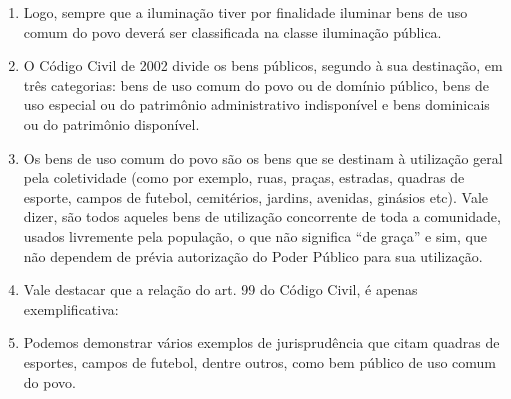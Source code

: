 \begin{enumerate}[resume]
{II - bens públicos destinados ao uso comum do povo, tais como abrigos de usuários de transportes coletivos, praças, parques e jardins, ainda que o uso esteja sujeito a condições estabelecidas pela administração, inclusive o cercamento, a restrição de horários e a cobrança. (Incluído pela REN ANEEL 800, de 19.12.2017). (Grifou-se) }

\item
Logo, sempre que a iluminação tiver por finalidade iluminar bens de uso comum do povo deverá ser classificada na classe iluminação pública.   
\item 
O Código Civil de 2002 divide os bens públicos, segundo à sua destinação, em três categorias: bens de uso comum do povo ou de domínio público, bens de uso especial ou do patrimônio administrativo indisponível e bens dominicais ou do patrimônio disponível.   
\item
Os bens de uso comum do povo são os bens que se destinam à utilização geral pela coletividade (como por exemplo, ruas, praças, estradas, quadras de esporte, campos de futebol, cemitérios, jardins, avenidas, ginásios etc). Vale dizer, são todos aqueles bens de utilização concorrente de toda a comunidade, usados livremente pela população, o que não significa “de graça” e sim, que não dependem de prévia autorização do Poder Público para sua utilização.   
\item
Vale destacar que a relação do art. 99 do Código Civil, é apenas exemplificativa:


\item 
Podemos demonstrar vários exemplos de jurisprudência que citam quadras de esportes, campos de futebol, dentre outros, como bem público de uso comum do povo. 


\end{enumerate}

